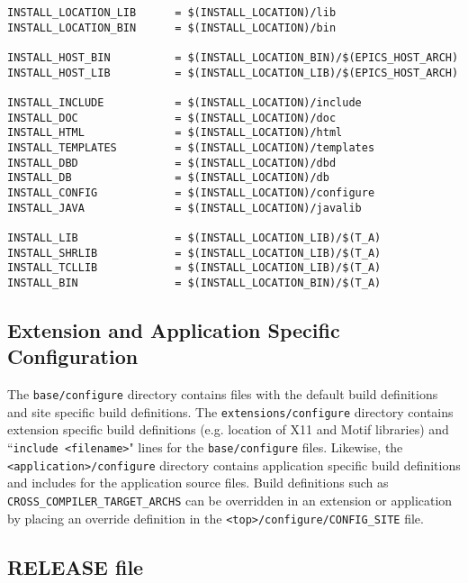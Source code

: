 \begin{verbatim}
INSTALL_LOCATION_LIB      = $(INSTALL_LOCATION)/lib
INSTALL_LOCATION_BIN      = $(INSTALL_LOCATION)/bin

INSTALL_HOST_BIN          = $(INSTALL_LOCATION_BIN)/$(EPICS_HOST_ARCH)
INSTALL_HOST_LIB          = $(INSTALL_LOCATION_LIB)/$(EPICS_HOST_ARCH)

INSTALL_INCLUDE           = $(INSTALL_LOCATION)/include
INSTALL_DOC               = $(INSTALL_LOCATION)/doc
INSTALL_HTML              = $(INSTALL_LOCATION)/html
INSTALL_TEMPLATES         = $(INSTALL_LOCATION)/templates
INSTALL_DBD               = $(INSTALL_LOCATION)/dbd
INSTALL_DB                = $(INSTALL_LOCATION)/db
INSTALL_CONFIG            = $(INSTALL_LOCATION)/configure
INSTALL_JAVA              = $(INSTALL_LOCATION)/javalib

INSTALL_LIB               = $(INSTALL_LOCATION_LIB)/$(T_A)
INSTALL_SHRLIB            = $(INSTALL_LOCATION_LIB)/$(T_A)
INSTALL_TCLLIB            = $(INSTALL_LOCATION_LIB)/$(T_A)
INSTALL_BIN               = $(INSTALL_LOCATION_BIN)/$(T_A)
\end{verbatim}

\subsection{Extension and Application Specific Configuration}

The \verb|base/configure| directory contains files with the default build definitions and site specific build definitions. The 
\verb|extensions/configure| directory contains extension specific build definitions (e.g. location of X11 and Motif libraries) and 
``\verb|include <filename>|" lines for the \verb|base/configure| files. Likewise, the \verb|<application>/configure| directory contains 
application specific build definitions and includes for the application source files. Build definitions such as \\ 
\verb|CROSS_COMPILER_TARGET_ARCHS| can be overridden in an extension or application by placing an override 
definition in the \verb|<top>/configure/CONFIG_SITE| file.

\subsection{RELEASE file}

